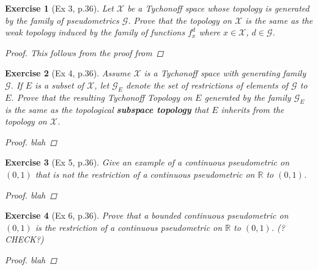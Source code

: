 \documentclass[11pt]{article}
\newtheorem{exercise}{Exercise}
\newcommand{\R}{\mathbb{R}}
\newcommand{\X}{\mathcal{X}}
\begin{document}
\begin{exercise}[Ex 3, p.36]
	Let $\X$ be a Tychonoff space whose topology is generated by the family of pseudometrics $\mathcal{G}$. Prove that the topology on $\X$ is the same as the weak topology induced by the family of functions $f_x^d$ where $x\in \X$, $d\in \mathcal{G}$.
	\begin{proof}
		This follows from the proof from  
	\end{proof}
\end{exercise}

\begin{exercise}[Ex 4, p.36]
	Assume $\X$ is a Tychonoff space with generating family $\mathcal{G}$. If $E$ is a subset of $\X$, let $\mathcal{G}_E$ denote the set of restrictions of elements of $\mathcal{G}$ to $E$. Prove that the resulting Tychonoff Topology on $E$ generated by the family $\mathcal{G}_E$ is the same as the topological \textbf{subspace topology} that $E$ inherits from the topology on $\X$. 
	\begin{proof}
		blah
	\end{proof}
\end{exercise}

\begin{exercise}[Ex 5, p.36]
	Give an example of a continuous pseudometric on $(0, 1)$ that is not the restriction of a continuous pseudometric on $\R$ to $(0, 1)$. 
	\begin{proof}
		blah
	\end{proof}
\end{exercise}

\begin{exercise}[Ex 6, p.36]
	Prove that a bounded continuous pseudometric on $(0, 1)$ is the restriction of
	a continuous pseudometric on $\R$ to $(0, 1)$. (?CHECK?)

	\begin{proof}
		blah
	\end{proof}
\end{exercise}
\end{document}
